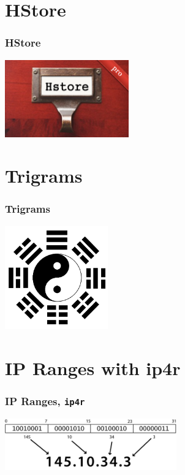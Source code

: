 \documentclass{beamer}
\begin{document}
\section{HStore}

\begin{frame}[fragile]
  \frametitle{HStore}

\begin{center}
  \includegraphics[height=9em]{hstore.png}
\end{center}
\end{frame}

\section{Trigrams}

\begin{frame}[fragile]
  \frametitle{Trigrams}

\begin{center}
  \includegraphics[height=12em]{trigramme.png}
\end{center}
\end{frame}

\section{IP Ranges with ip4r}

\begin{frame}[fragile]
  \frametitle{IP Ranges, \texttt{ip4r}}

\begin{center}
  \includegraphics[height=6em]{ip-address.png}
\end{center}
\end{frame}
\end{document}
